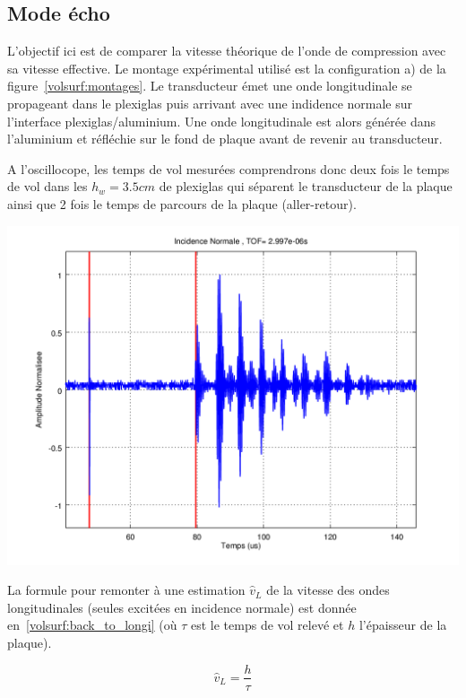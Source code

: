\subsection{Mode écho}
\label{volsurf:vol_echo}

L'objectif ici est de comparer la vitesse théorique de l'onde de compression avec sa vitesse effective.
Le montage expérimental utilisé est la configuration a) de la figure~\ref{volsurf:montages}.
Le transducteur émet une onde longitudinale se propageant dans le plexiglas puis arrivant avec une indidence normale sur l'interface plexiglas/aluminium.
Une onde longitudinale est alors générée dans l'aluminium et réfléchie sur le fond de plaque avant de revenir au transducteur.

A l'oscillocope, les temps de vol mesurées comprendrons donc deux fois le temps de vol dans les $h_w = 3.5cm$ de plexiglas qui séparent le transducteur de la plaque ainsi que 2 fois le temps de parcours de la plaque (aller-retour).

\begin{figurehere}
    \centering
    \includegraphics[width=.5\textwidth]{volsurf_figs/DS0000_incnorm.png}
    \caption{Mesure ultrasonore en mode écho. Connaissant l'écart temporel entre le signal de synchronisation (à environ $20\mu s$) et le début du premier écho (à environ $80\mu s$) il est possible de remonter à l'épaisseur de plaque (connaissant la vitesse ou \textit{vice versa}). Les calculs sont donnés au paragraphe~\ref{volsurf:vol_echo}.}
    \label{volsurf:echo_norm}
\end{figurehere}

La formule pour remonter à une estimation $\hat{v}_L$ de la vitesse des ondes longitudinales (seules excitées en incidence normale) est donnée en~\eqref{volsurf:back_to_longi} (où $\tau$ est le temps de vol relevé et $h$ l'épaisseur de la plaque). 

\begin{equation}
    \hat{v}_L = \frac{h}{\tau}
    \label{volsurf:back_to_longi}
\end{equation}

